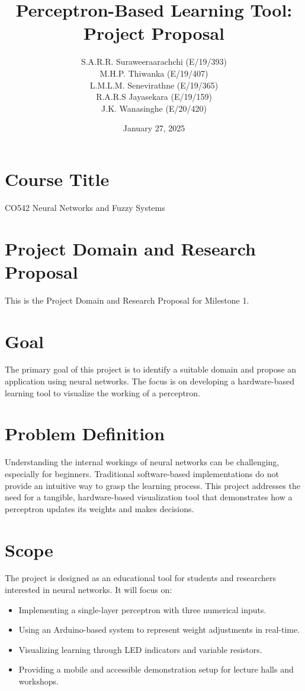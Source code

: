 \documentclass{article}
\title{Perceptron-Based Learning Tool: Project Proposal}
\author{
    S.A.R.R. Suraweeraarachchi (E/19/393) \\
    M.H.P. Thiwanka (E/19/407) \\
    L.M.L.M. Senevirathne (E/19/365) \\
    R.A.R.S Jayasekara (E/19/159) \\
    J.K. Wanasinghe (E/20/420)
}
\date{January 27, 2025}
\begin{document}
\maketitle

\section*{Course Title}
CO542 Neural Networks and Fuzzy Systems

\section*{Project Domain and Research Proposal}
This is the Project Domain and Research Proposal for Milestone 1.

\section{Goal}
The primary goal of this project is to identify a suitable domain and propose an application using neural networks. The focus is on developing a hardware-based learning tool to visualize the working of a perceptron.

\section{Problem Definition}
Understanding the internal workings of neural networks can be challenging, especially for beginners. Traditional software-based implementations do not provide an intuitive way to grasp the learning process. This project addresses the need for a tangible, hardware-based visualization tool that demonstrates how a perceptron updates its weights and makes decisions.

\section{Scope}
The project is designed as an educational tool for students and researchers interested in neural networks. It will focus on:

\begin{itemize}
    \item Implementing a single-layer perceptron with three numerical inputs.
    \item Using an Arduino-based system to represent weight adjustments in real-time.
    \item Visualizing learning through LED indicators and variable resistors.
    \item Providing a mobile and accessible demonstration setup for lecture halls and workshops.
\end{itemize}
\end{document}
